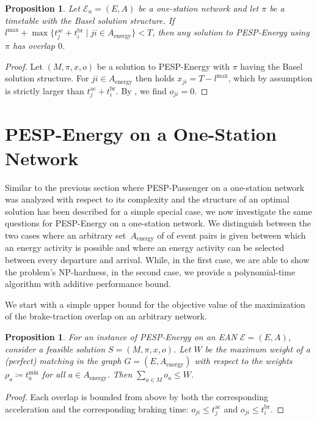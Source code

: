 \documentclass[11pt,a4paper]{article}
\newcommand{\energy}{\mathrm{energy}}
\newcommand{\energyact}{M}               %
\newcommand{\possenergyact}{A_{\energy}} %
\newcommand{\ac}{\mathrm{ac}}
\newcommand{\br}{\mathrm{br}}
\newcommand{\pesppassenger}{PESP-Passenger\xspace}
\newcommand{\pespenergy}{PESP-Energy\xspace}
\newcommand{\osn}{one-station network\xspace}
\newcommand{\w}{\rho} %
\newcommand{\cE}{\mathcal{E}}
\newtheorem{proposition}[theorem]{Proposition}
\theoremstyle{definition}
\theoremstyle{remark}
\begin{document}
\begin{proposition}
    Let $\cE_n = (E, A)$ be a one-station network and let $\pi$ be a timetable with the Basel solution structure. If $l^{\max} + \max\{t^\ac_{j} + t^\br_{i} \mid ji \in A_\energy\} < T$, then any solution to \pespenergy using $\pi$ has overlap $0$.
\end{proposition}
\begin{proof}
    Let $(M, \pi, x, o)$ be a solution to \pespenergy with $\pi$ having the Basel solution structure. For $ji \in A_\energy$ then holds $x_{ji} = T  - l^{\max}$, which by assumption is strictly larger than $t^\ac_{j} + t^\br_{i}$. By , we find $o_{ji} = 0$.
\end{proof}



\section{\pespenergy on a One-Station Network} \label{sec:pesp-energy-one-station}

Similar to the previous section where \pesppassenger on a \osn was analyzed with respect to its complexity and the structure of an optimal solution has been described for a simple special case, we now investigate the same questions for \pespenergy on a  \osn. We distinguish between the two cases where an arbitrary set~$\possenergyact$ of of event pairs is given between which an energy activity is possible and where an energy activity can be selected between every departure and arrival. While, in the first case, we are able to show the problem's NP-hardness, in the second case, we provide a polynomial-time algorithm with additive performance bound. 

We start with a simple upper bound for the objective value of the maximization of the brake-traction overlap on an arbitrary network.


\begin{proposition}\label{prop:upperbound-matching}
	For an instance of \pespenergy on an EAN $\cE = (E, A)$, consider a feasible solution $S= (\energyact, \pi, x, o)$. Let $W$ be the maximum weight of a (perfect) matching in the graph $G=(E, \possenergyact)$ with respect to the weights~$\w_a \coloneqq t^{\min}_a$ for all $a \in \possenergyact$. Then $\sum_{a \in \energyact} o_a \leq W$.
\end{proposition}

\begin{proof}
	Each overlap is bounded from above by both the corresponding acceleration and the corresponding braking time: $o_{ji} \leq t_{j}^{\ac}$ and $o_{ji} \leq t_{i}^{\br}$.
\end{proof}
\end{document}
